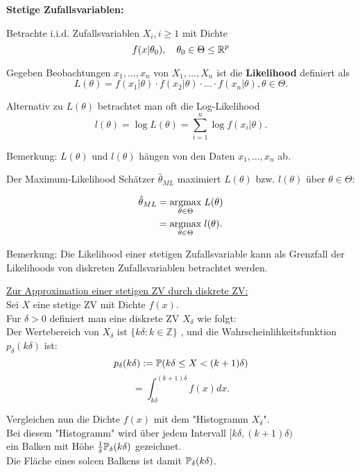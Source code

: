 \documentclass{tstextbook}
\begin{document}
\textbf{Stetige Zufallsvariablen:}

Betrachte i.i.d. Zufallsvariablen $ X_i, i \geq 1 $ mit Dichte 
\[
f(x|\theta_0), \quad \theta_0\in\Theta \leq \mathbb R^p
\]

Gegeben Beobachtungen $ x_1,\ldots,x_n $ von $ X_1,\ldots,X_n $ ist die \textbf{Likelihood} definiert als 
\[
L(\theta) = f(x_1|\theta)\cdot f(x_2|\theta)\cdot\ldots\cdot f(x_n|\theta), \theta \in \Theta.
\]

Alternativ zu $ L(\theta) $ betrachtet man oft die Log-Likelihood 
\[
l(\theta) = \log L(\theta) = \sum_{i=1}^{n} \log f(x_i|\theta).
\]

\begin{remark}
	Bemerkung: $ L(\theta) $ und $ l(\theta) $ hängen von den Daten $ x_1,\ldots,x_n $ ab.
\end{remark}

Der Maximum-Likelihood Schätzer $ \hat{\theta}_{ML}$ maximiert $ L(\theta) $ bzw. $ l(\theta) $ über $ \theta\in\Theta $: 

\[
\begin{aligned}
	\hat{\theta}_{ML} & = \underset{\theta\in\Theta}{\operatorname{argmax}}\; L(\theta) \\
	& = \underset{\theta\in\Theta}{\operatorname{argmax}}\; l(\theta) .
\end{aligned}
\]


\begin{remark}
	Bemerkung: Die Likelihood einer stetigen Zufallsvariable kann als Grenzfall der Likelihoods von diskreten Zufallsvariablen betrachtet werden. 
\end{remark}

\underline{Zur Approximation einer stetigen ZV durch diskrete ZV:}\\

Sei $ X $ eine stetige ZV mit Dichte $f(x)$. \\
Fur $\delta >0 $ definiert man eine diskrete ZV $X_\delta$ wie folgt: \\
Der Wertebereich von $ X_{\delta} \text{ ist }  \{ k\delta: k \in \mathbb{Z}  \} $ , und die Wahrscheinlihkeitsfunktion $p_{\delta} (k\delta) $ ist:  \\

\[
p_\delta (k\delta) := \mathbb P( k \delta \leq X < (k+1)\delta )
\]
\[
 = \int_{k\delta}^{(k+1)\delta} f(x) dx .
\]

Vergleichen nun die Dichte $f(x)$ mit dem "Histogramm $X_\delta$".\\
Bei diesem "Histogramm"  wird über jedem Intervall $ [k\delta, (k+1)\delta)$ \\
ein Balken mit Höhe $\frac{1}{\delta} \mathbb P_\delta (k\delta)$ gezeichnet. \\
Die Fläche eines solcen Balkens ist damit $\mathbb P_\delta (k\delta)$. \\
\end{document}
